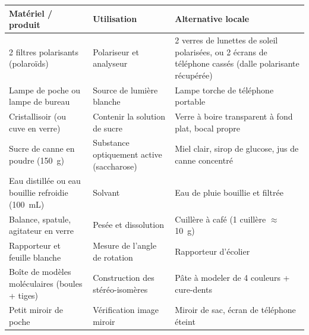 \documentclass[11pt]{article}
\newcounter{popsec}
\newcounter{popsub}
\newcommand{\courssub}[1]{%
  \stepcounter{popsub}%
  \par\vspace{9pt}\noindent{\popxbold\fontsize{11.5}{13}\selectfont\color{popink}{\color{poporange}\thepopsec.\thepopsub}\hspace{6pt}#1}\par\nopagebreak\vspace{4pt}
}
\begin{document}
\begin{center}
\begin{tabularx}{\linewidth}{|l|X|l|}
\hline
\rowcolor{popblue!40} \textbf{Matériel / produit} & \textbf{Utilisation} & \textbf{Alternative locale} \\
\hline
2 filtres polarisants (polaroïds) & Polariseur et analyseur & 2 verres de lunettes de soleil polarisées, ou 2 écrans de téléphone cassés (dalle polarisante récupérée) \\
\hline
Lampe de poche ou lampe de bureau & Source de lumière blanche & Lampe torche de téléphone portable \\
\hline
Cristallisoir (ou cuve en verre) & Contenir la solution de sucre & Verre à boire transparent à fond plat, bocal propre \\
\hline
Sucre de canne en poudre (\SI{150}{g}) & Substance optiquement active (saccharose) & Miel clair, sirop de glucose, jus de canne concentré \\
\hline
Eau distillée ou eau bouillie refroidie (\SI{100}{mL}) & Solvant & Eau de pluie bouillie et filtrée \\
\hline
Balance, spatule, agitateur en verre & Pesée et dissolution & Cuillère à café (1 cuillère $\approx$ \SI{10}{g}) \\
\hline
Rapporteur et feuille blanche & Mesure de l'angle de rotation & Rapporteur d'écolier \\
\hline
Boîte de modèles moléculaires (boules + tiges) & Construction des stéréo-isomères & Pâte à modeler de 4 couleurs + cure-dents \\
\hline
Petit miroir de poche & Vérification image miroir & Miroir de sac, écran de téléphone éteint \\
\hline
\end{tabularx}
\end{center}

\courssub{Sécurité}
\end{document}
